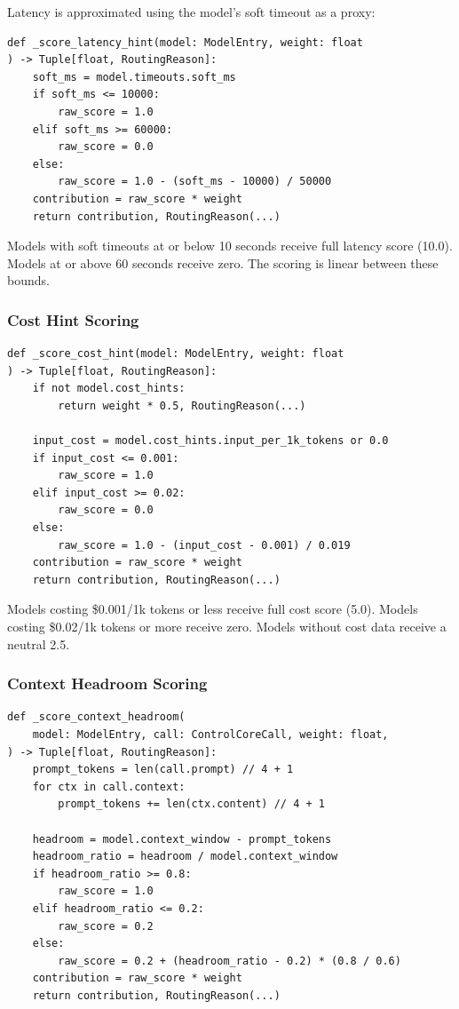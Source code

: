 \documentclass[11pt,a4paper]{article}
\theoremstyle{plain}
\theoremstyle{definition}
\begin{document}
Latency is approximated using the model's soft timeout as a proxy:

\begin{lstlisting}[style=pythonstyle, caption={Latency scoring from \texttt{routing.py}}]
def _score_latency_hint(model: ModelEntry, weight: float
) -> Tuple[float, RoutingReason]:
    soft_ms = model.timeouts.soft_ms
    if soft_ms <= 10000:
        raw_score = 1.0
    elif soft_ms >= 60000:
        raw_score = 0.0
    else:
        raw_score = 1.0 - (soft_ms - 10000) / 50000
    contribution = raw_score * weight
    return contribution, RoutingReason(...)
\end{lstlisting}

Models with soft timeouts at or below 10 seconds receive full latency score
(10.0). Models at or above 60 seconds receive zero. The scoring is linear
between these bounds.

\subsubsection{Cost Hint Scoring}

\begin{lstlisting}[style=pythonstyle, caption={Cost scoring from \texttt{routing.py}}]
def _score_cost_hint(model: ModelEntry, weight: float
) -> Tuple[float, RoutingReason]:
    if not model.cost_hints:
        return weight * 0.5, RoutingReason(...)

    input_cost = model.cost_hints.input_per_1k_tokens or 0.0
    if input_cost <= 0.001:
        raw_score = 1.0
    elif input_cost >= 0.02:
        raw_score = 0.0
    else:
        raw_score = 1.0 - (input_cost - 0.001) / 0.019
    contribution = raw_score * weight
    return contribution, RoutingReason(...)
\end{lstlisting}

Models costing \$0.001/1k tokens or less receive full cost score (5.0). Models
costing \$0.02/1k tokens or more receive zero. Models without cost data receive
a neutral 2.5.

\subsubsection{Context Headroom Scoring}

\begin{lstlisting}[style=pythonstyle, caption={Context headroom scoring from \texttt{routing.py}}]
def _score_context_headroom(
    model: ModelEntry, call: ControlCoreCall, weight: float,
) -> Tuple[float, RoutingReason]:
    prompt_tokens = len(call.prompt) // 4 + 1
    for ctx in call.context:
        prompt_tokens += len(ctx.content) // 4 + 1

    headroom = model.context_window - prompt_tokens
    headroom_ratio = headroom / model.context_window
    if headroom_ratio >= 0.8:
        raw_score = 1.0
    elif headroom_ratio <= 0.2:
        raw_score = 0.2
    else:
        raw_score = 0.2 + (headroom_ratio - 0.2) * (0.8 / 0.6)
    contribution = raw_score * weight
    return contribution, RoutingReason(...)
\end{lstlisting}
\end{document}
